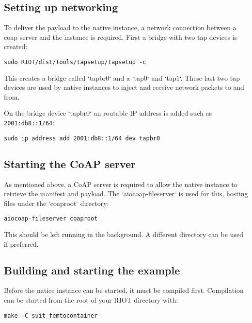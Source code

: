 \documentclass[../main.tex]{subfiles}
\begin{document}
\subsection{Setting up networking}

To deliver the payload to the native instance, a network connection between a
coap server and the instance is required. First a bridge with two tap devices is created:

\begin{lstlisting}
sudo RIOT/dist/tools/tapsetup/tapsetup -c
\end{lstlisting}

This creates a bridge called `tapbr0` and a `tap0` and `tap1`. These last two
tap devices are used by native instances to inject and receive network packets
to and from.

On the bridge device `tapbr0` an routable IP address is added such as
\texttt{2001:db8::1/64}:

\begin{lstlisting}
sudo ip address add 2001:db8::1/64 dev tapbr0
\end{lstlisting}

\subsection{Starting the CoAP server}

As mentioned above, a CoAP server is required to allow the native instance to
retrieve the manifest and payload. The `aiocoap-fileserver` is used for this,
hosting files under the `coaproot` directory:

\begin{lstlisting}
aiocoap-fileserver coaproot
\end{lstlisting}

This should be left running in the background. A different directory can be used
if preferred.

\subsection{Building and starting the example}

Before the natice instance can be started, it must be compiled first.
Compilation can be started from the root of your RIOT directory with:

\begin{lstlisting}
make -C suit_femtocontainer
\end{lstlisting}
\end{document}
